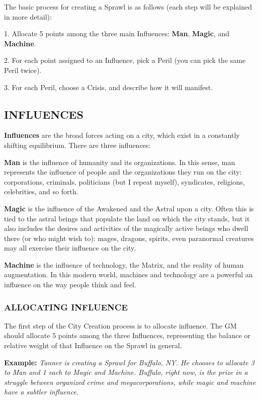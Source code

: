 \documentclass[oneside,10pt]{article}
\begin{document}
\begin{multicols}{2}
The basic process for creating a Sprawl is as follows (each step
will be explained in more detail):
\begin{dent}
1.	Allocate 5 points among the three main Influences:
\textbf{Man}, \textbf{Magic}, and \textbf{Machine}.

2.	For each point assigned to an Influence, pick a Peril (you
can pick the same Peril twice).

3.	For each Peril, choose a Crisis, and describe how it will
manifest.
\end{dent}

\subsection{INFLUENCES}
\textbf{Influences} are the broad forces acting on a city, which exist
in a constantly shifting equilibrium. There are three influences:

\textbf{Man} is the influence of humanity and its organizations. In
this sense, man represents the influence of people and the
organizations they run on the city: corporations, criminals,
politicians (but I repeat myself), syndicates, religions, celebrities, and so forth.

\textbf{Magic} is the influence of the Awakened and the Astral upon
a city. Often this is tied to the astral beings that populate the
land on which the city stands, but it also includes the desires
and activities of the magically active beings who dwell there
(or who might wish to): mages, dragons, spirits, even paranormal creatures may all exercise their influence on the city.

\textbf{Machine} is the influence of technology, the Matrix, and the
reality of human augmentation. In this modern world, machines and technology are a powerful an influence on the way
people think and feel.

\subsubsection{ALLOCATING INFLUENCE}
The first step of the City Creation process is to allocate influence. The GM should allocate 5 points among the three
Influences, representing the balance or relative weight of that
Influence on the Sprawl in general.
\begin{dent}
\textbf{Example:} \textit{Tanner is creating a Sprawl for Buffalo, NY. He
chooses to allocate 3 to Man and 1 each to Magic and Machine. Buffalo, right now, is the prize in a struggle between
organized crime and megacorporations, while magic and
machine have a subtler influence.}
\end{dent}

\end{multicols}
\end{document}
